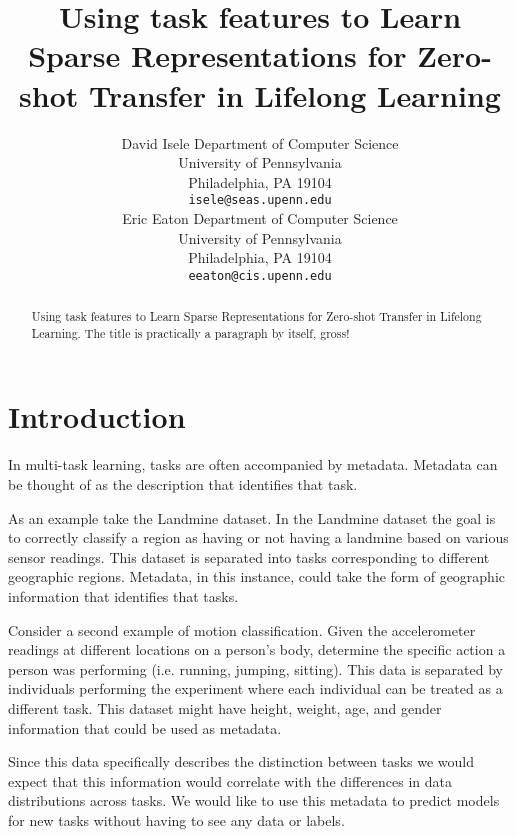 \documentclass{article} %
\title{Using task features to Learn Sparse Representations for Zero-shot Transfer in Lifelong Learning}
\author{
David Isele
Department of Computer Science\\
University of Pennsylvania\\
Philadelphia, PA 19104 \\
\texttt{isele@seas.upenn.edu} \\
\And
Eric Eaton
Department of Computer Science\\
University of Pennsylvania\\
Philadelphia, PA 19104 \\
\texttt{eeaton@cis.upenn.edu} \\
}
\begin{document}
\maketitle

\begin{abstract}
Using task features to Learn Sparse Representations for Zero-shot Transfer in Lifelong Learning. The title is practically a paragraph by itself, gross!
\end{abstract}



\section{Introduction}
In multi-task learning, tasks are often accompanied by metadata. Metadata can be thought of as the description that identifies that task.

As an example take the Landmine dataset. In the Landmine dataset the goal is to correctly classify a region as having or not having a landmine based on various sensor readings. This dataset is separated into tasks corresponding to different geographic regions. Metadata, in this instance,  could take the form of geographic information that identifies that tasks. 

Consider a second example of motion classification. Given the accelerometer readings at different locations on a person's body, determine the specific action a person was performing (i.e. running, jumping, sitting). This data is separated by individuals performing the experiment where each individual can be treated as a different task. This dataset might have height, weight, age, and gender information that could be used as metadata.

Since this data specifically describes the distinction between tasks we would expect that this information would correlate with the differences in data distributions across tasks. We would like to use this metadata to predict models for new tasks without having to see any data or labels. 
\end{document}
